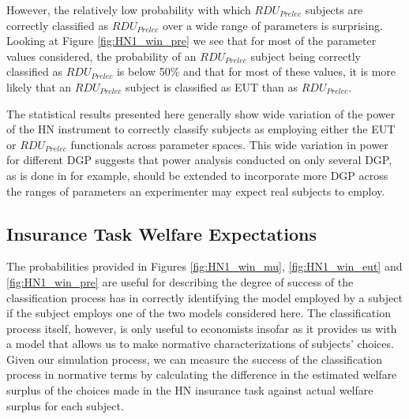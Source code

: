 \documentclass[../main.tex]{subfiles}
\begin{document}
However, the relatively low probability with which $\mathit{RDU_{Prelec}}$ subjects are correctly classified as $\mathit{RDU_{Prelec}}$ over a wide range of parameters is surprising.
Looking at Figure \ref{fig:HN1_win_pre} we see that for most of the parameter values considered, the probability of an $\mathit{RDU_{Prelec}}$ subject being correctly classified as $\mathit{RDU_{Prelec}}$ is below 50\% and that for most of these values, it is more likely that an $\mathit{RDU_{Prelec}}$ subject is classified as EUT than as $\mathit{RDU_{Prelec}}$.

The statistical results presented here generally show wide variation of the power of the HN instrument to correctly classify subjects as employing either the EUT or $\mathit{RDU_{Prelec}}$ functionals across parameter spaces.
This wide variation in power for different DGP suggests that power analysis conducted on only several DGP, as is done in \textcite{Wilcox2015} for example, should be extended to incorporate more DGP across the ranges of parameters an experimenter may expect real subjects to employ.

\singlespacing
\subsection{\texorpdfstring{\textcite{Harrison2016}}{Harrison and Ng (2016)} Insurance Task Welfare Expectations}
\doublespacing
\label{sec4:WT}

The probabilities provided in Figures \ref{fig:HN1_win_mu}, \ref{fig:HN1_win_eut} and \ref{fig:HN1_win_pre} are useful for describing the degree of success of the classification process has in correctly identifying the model employed by a subject if the subject employs one of the two models considered here.
The classification process itself, however, is only useful to economists insofar as it provides us with a model that allows us to make normative characterizations of subjects' choices.
Given our simulation process, we can measure the success of the classification process in normative terms by calculating the difference in the estimated welfare surplus of the choices made in the HN insurance task against actual welfare surplus for each subject.
\end{document}
